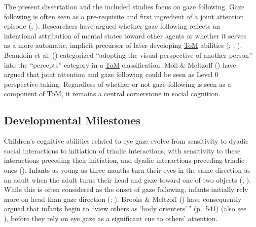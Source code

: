 \documentclass[
]{scrbook}
\begin{document}
The present dissertation and the included studies focus on gaze following. Gaze following is often seen as a pre-requisite and first ingredient of a joint attention episode (; ). Researchers have argued whether gaze following reflects an intentional attribution of mental states toward other agents or whether it serves as a more automatic, implicit precursor of later-developing \hyperref[acronyms_ToM]{ToM} abilities (; ; ). Beaudoin et al. () categorized ``adopting the visual perspective of another person'' into the ``percepts'' category in a \hyperref[acronyms_ToM]{ToM} classification. Moll \& Meltzoff () have argued that joint attention and gaze following could be seen as Level 0 perspective-taking. Regardless of whether or not gaze following is seen as a component of \hyperref[acronyms_ToM]{ToM}, it remains a central cornerstone in social cognition.

\subsection{Developmental Milestones}\label{developmental-milestones-1}

Children's cognitive abilities related to eye gaze evolve from sensitivity to dyadic social interactions to initiation of triadic interactions, with sensitivity to these interactions preceding their initiation, and dyadic interactions preceding triadic ones (). Infants as young as three months turn their eyes in the same direction as an adult when the adult turns their head and gaze toward one of two objects (; ). While this is often considered as the onset of gaze following, infants initially rely more on head than gaze direction (; ). Brooks \& Meltzoff () have consequently argued that infants begin to ``view others as `body orienters'\,'' (p.~541) (also see ), before they rely on eye gaze as a significant cue to others' attention.
\end{document}

